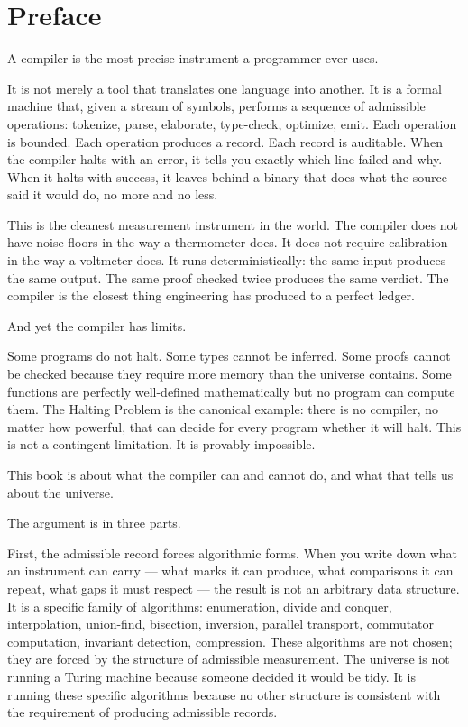 \chapter*{Preface}
\label{chap:preface}

A compiler is the most precise instrument a programmer ever uses.

It is not merely a tool that translates one language into another. It is a
formal machine that, given a stream of symbols, performs a sequence of
admissible operations: tokenize, parse, elaborate, type-check, optimize,
emit. Each operation is bounded. Each operation produces a record. Each
record is auditable. When the compiler halts with an error, it tells you
exactly which line failed and why. When it halts with success, it leaves
behind a binary that does what the source said it would do, no more and no
less.

This is the cleanest measurement instrument in the world. The compiler does
not have noise floors in the way a thermometer does. It does not require
calibration in the way a voltmeter does. It runs deterministically: the
same input produces the same output. The same proof checked twice produces
the same verdict. The compiler is the closest thing engineering has produced
to a perfect ledger.

And yet the compiler has limits.

Some programs do not halt. Some types cannot be inferred. Some proofs cannot
be checked because they require more memory than the universe contains.
Some functions are perfectly well-defined mathematically but no program can
compute them. The Halting Problem is the canonical example: there is no
compiler, no matter how powerful, that can decide for every program whether
it will halt. This is not a contingent limitation. It is provably impossible.

This book is about what the compiler can and cannot do, and what that tells
us about the universe.

The argument is in three parts.

First, the admissible record forces algorithmic forms. When you write down
what an instrument can carry --- what marks it can produce, what comparisons
it can repeat, what gaps it must respect --- the result is not an arbitrary
data structure. It is a specific family of algorithms: enumeration, divide
and conquer, interpolation, union-find, bisection, inversion, parallel
transport, commutator computation, invariant detection, compression. These
algorithms are not chosen; they are forced by the structure of admissible
measurement. The universe is not running a Turing machine because someone
decided it would be tidy. It is running these specific algorithms because
no other structure is consistent with the requirement of producing
admissible records.

